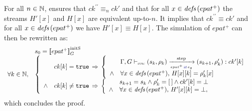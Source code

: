 \begin{skippableproof}
    For all $n \in \mathbb{N}$,  ensures that
    $ck^{\prime\prime} \equiv_n ck'$ and that for all $x \in {\ensuremath{\textit{defs}\left(epat^+\right)}}$ the streams $H'[x]$ and
    $H[x]$ are equivalent up-to-$n$. It implies that $ck^{\prime\prime} \equiv ck'$ and for all $x
        \in {\ensuremath{\textit{defs}\left(epat^+\right)}}$ we have $H'[x] \equiv H[x]$. The simulation of $epat^+$ can then be
    rewritten as:
    \begin{equation*}
        \begin{array}{ll}
                              & s_0 = \initstate{epat^+} \\
            \forall k \in \N, &
            \left\{
            \begin{array}{ll}
                       & ck[k] = \true \, \Rightarrow \,
                \left\{
                \begin{array}{ll}
                           & \epatOpsem{\rho_k}{s_k}{\guarded{epat^+}{e_g}}{s_{k+1}}{ck'[k]}{\rho'_k} \\
                    \wedge & \forall x \in \defs{epat^+}, \, H[x][k] = \rho'_k[x]                     \\
                \end{array}
                \right.                                     \\
                \wedge & ck[k] \neq \true \, \Rightarrow \,
                \left\{
                \begin{array}{ll}
                           & s_{k+1} = s_k \wedge \rho'_k = \emptyrho \wedge ck'[k] = \bot \\
                    \wedge & \forall x \in \defs{epat^+}, \,  H'[x][k] = \bot,             \\
                \end{array}
                \right.                                     \\
            \end{array}
            \right.
        \end{array}
    \end{equation*}
    which concludes the proof.

    \setcounter{paragraph}{0}
    \setcounter{subparagraph}{0}
\end{skippableproof}

